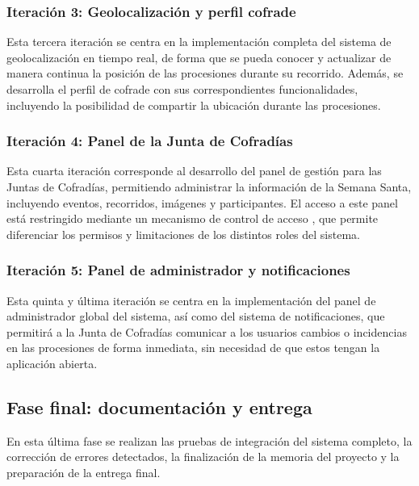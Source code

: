 \subsubsection{Iteración 3: Geolocalización y perfil cofrade}

Esta tercera iteración se centra en la implementación completa del sistema de geolocalización en tiempo real, de forma que se pueda conocer y actualizar de manera continua la posición de las procesiones durante su recorrido. Además, se desarrolla el perfil de cofrade con sus correspondientes funcionalidades, incluyendo la posibilidad de compartir la ubicación durante las procesiones.

\subsubsection{Iteración 4: Panel de la Junta de Cofradías}

Esta cuarta iteración corresponde al desarrollo del panel de gestión para las Juntas de Cofradías, permitiendo administrar la información de la Semana Santa, incluyendo eventos, recorridos, imágenes y participantes. El acceso a este panel está restringido mediante un mecanismo de control de acceso \cite{owasp}, que permite diferenciar los permisos y limitaciones de los distintos roles del sistema.

\subsubsection{Iteración 5: Panel de administrador y notificaciones}

Esta quinta y última iteración se centra en la implementación del panel de administrador global del sistema, así como del sistema de notificaciones, que permitirá a la Junta de Cofradías comunicar a los usuarios cambios o incidencias en las procesiones de forma inmediata, sin necesidad de que estos tengan la aplicación abierta.

\subsection{Fase final: documentación y entrega}

En esta última fase se realizan las pruebas de integración del sistema completo, la corrección de errores detectados, la finalización de la memoria del proyecto y la preparación de la entrega final.
